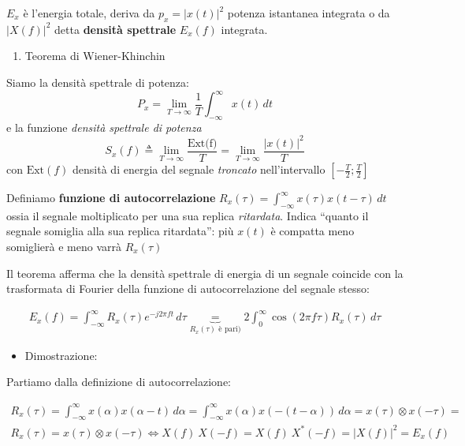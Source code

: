 \documentclass[
  paper=a4,
  ,captions=tableheading
]{scrartcl}
\providecommand{\tightlist}{%
  \setlength{\itemsep}{0pt}\setlength{\parskip}{0pt}}
\begin{document}
\(E_x\) è l'energia totale, deriva da \(p_x = |x(t)|^2\) potenza
istantanea integrata o da \(|X(f)|^2\) detta \textbf{densità spettrale}
\(E_x(f)\) integrata.

\begin{enumerate}
\def\labelenumi{\arabic{enumi}.}
\setcounter{enumi}{1}
\tightlist
\item
  Teorema di Wiener-Khinchin
\end{enumerate}

Siamo la densità spettrale di potenza: \[
P_x = \lim_{T\to \infty} \frac{1}{T}\int_{-\infty}^{\infty} x(t) \,dt 
\] e la funzione \emph{densità spettrale di potenza} \[
S_x(f) \triangleq \lim_{T\to \infty} \frac{\text{Ext(f)}}{T} =\lim_{T\to\infty} \frac{|x(t)|^2}{T} 
\] con \(\text{Ext}(f)\) densità di energia del segnale \emph{troncato}
nell'intervallo \([-\frac{T}{2}; \frac{T}{2}]\)

Definiamo \textbf{funzione di autocorrelazione}
\(R_x(\tau)= \int_{-\infty}^{\infty}x(\tau)x(t-\tau)\,dt\) ossia il
segnale moltiplicato per una sua replica \emph{ritardata}. Indica
``quanto il segnale somiglia alla sua replica ritardata'': più \(x(t)\)
è compatta meno somiglierà e meno varrà \(R_x(\tau)\)

Il teorema afferma che la densità spettrale di energia di un segnale
coincide con la trasformata di Fourier della funzione di
autocorrelazione del segnale stesso:

\begin{gather*}
E_x(f)= \int_{-\infty}^{\infty}R_{x}(\tau) e^{-j2\pi ft}\,d\tau \underbrace{=}_{R_x(\tau) \text{ è pari})} 2\int_{0}^{\infty} \cos(2\pi f\tau)R_x(\tau) \,d\tau
\end{gather*}

\begin{itemize}
\tightlist
\item
  Dimostrazione:
\end{itemize}

Partiamo dalla definizione di autocorrelazione:

\begin{gather*}
R_{x} (\tau) = \int_{-\infty}^{\infty} x(\alpha) x(\alpha -t) \,d\alpha = \int_{-\infty}^{\infty} x(\alpha)x(-(t-\alpha)) \,d\alpha = x(\tau) \otimes x(-\tau) = \\
R_{x} (\tau) =  x(\tau) \otimes x(-\tau) \Longleftrightarrow X(f) \ X(-f) = X(f) \ X^{*}(-f) = |X(f)|^{2} = E_x(f)
\end{gather*}
\end{document}
